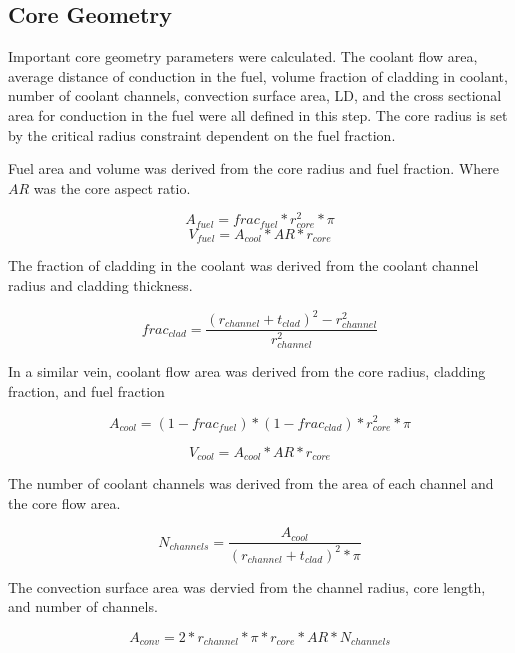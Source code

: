 \subsection{Core Geometry}
Important core geometry parameters were calculated. The coolant flow area,
average distance of conduction in the fuel, volume fraction of cladding in
coolant, number of coolant channels, convection surface area, LD, and the cross
sectional area for conduction in the fuel were all defined in this step. The
core radius is set by the critical
radius constraint dependent on the fuel fraction.

Fuel area and volume was derived from the core radius and fuel fraction. Where
$AR$ was the core aspect ratio.

\begin{equation}
    A_{fuel} = frac_{fuel}*r_{core}^2*\pi
\end{equation}
\begin{equation}
    V_{fuel} = A_{cool}*AR*r_{core}
\end{equation}

The fraction of cladding in the coolant was derived from the coolant channel
radius and cladding thickness.

\begin{equation}
    frac_{clad} = \frac{(r_{channel} + t_{clad})^2 - r_{channel}^2}{r_{channel}^2} 
\end{equation}

In a similar vein, coolant flow area was derived from the core radius, cladding
fraction, and fuel fraction

\begin{equation}
    A_{cool} = (1-frac_{fuel})*(1-frac_{clad})*r_{core}^2*\pi
\end{equation}

\begin{equation}
    V_{cool} = A_{cool}*AR*r_{core}
\end{equation}

The number of coolant channels was derived from the area of each channel and the
core flow area.

\begin{equation}
    N_{channels} = \frac{A_{cool}}{(r_{channel} + t_{clad})^2 * \pi}
\end{equation}

The convection surface area was dervied from the channel radius, core length, and
number of channels.

\begin{equation}
    A_{conv} = 2*r_{channel}*\pi*r_{core}*AR*N_{channels}    
\end{equation}


